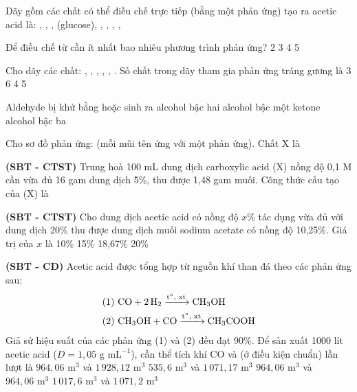 \documentclass[12pt,a4paper]{article}
\begin{document}
\begin{ex}
Dãy gồm các chất có thể điều chế trực tiếp (bằng một phản ứng) tạo ra acetic acid là:
\choice
{, , }
{,  (glucose), }
{, , }
{, , }
\end{ex}

\begin{ex}
Để điều chế  từ  cần ít nhất bao nhiêu phương trình phản ứng?
\choice
{2}
{3}
{4}
{5}
\end{ex}

\begin{ex}
Cho dãy các chất: , , , , , . Số chất trong dãy tham gia phản ứng tráng gương là
\choice
{3}
{6}
{4}
{5}
\end{ex}

\begin{ex}
Aldehyde bị khử bằng  hoặc  sinh ra
\choice
{alcohol bậc hai}
{alcohol bậc một}
{ketone}
{alcohol bậc ba}
\end{ex}

\begin{ex}
Cho sơ đồ phản ứng:  (mỗi mũi tên ứng với một phản ứng). Chất X là
\choice
{}
{}
{}
{}
\end{ex}

\begin{ex}
\textbf{(SBT - CTST)} Trung hoà 100 mL dung dịch carboxylic acid (X) nồng độ 0,1 M cần vừa đủ 16 gam dung dịch  5\%, thu được 1,48 gam muối. Công thức cấu tạo của (X) là
\choice
{}
{}
{}
{}
\end{ex}

\begin{ex}
\textbf{(SBT - CTST)} Cho dung dịch acetic acid có nồng độ $x\%$ tác dụng vừa đủ với dung dịch  20\% thu được dung dịch muối sodium acetate có nồng độ 10,25\%. Giá trị của $x$ là
\choice
{10\%}
{15\%}
{18,67\%}
{20\%}
\end{ex}

\begin{ex}
\textbf{(SBT - CD)} Acetic acid được tổng hợp từ nguồn khí than đá theo các phản ứng sau:
\begin{align*}
\text{(1) } & \ce{CO + 2H2 ->[{t$^\circ$, xt}] CH3OH} \\
\text{(2) } & \ce{CH3OH + CO ->[{t$^\circ$, xt}] CH3COOH}
\end{align*}
Giả sử hiệu suất của các phản ứng (1) và (2) đều đạt 90\%. Để sản xuất 1000 lít acetic acid ($D = 1,05\text{ g mL}^{-1}$), cần thể tích khí CO và  (ở điều kiện chuẩn) lần lượt là
\choice
{$964,06\text{ m}^3$ và $1\,928,12\text{ m}^3$}
{$535,6\text{ m}^3$ và $1\,071,17\text{ m}^3$}
{$964,06\text{ m}^3$ và $964,06\text{ m}^3$}
{$1\,017,6\text{ m}^3$ và $1\,071,2\text{ m}^3$}
\end{ex}
\end{document}
